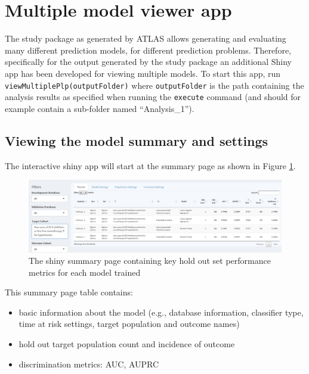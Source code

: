 \documentclass[11pt]{book}
\providecommand{\tightlist}{%
  \setlength{\itemsep}{0pt}\setlength{\parskip}{0pt}}
\theoremstyle{definition}
\theoremstyle{definition}
\theoremstyle{definition}
\theoremstyle{remark}
\begin{document}
\hypertarget{multiple-model-viewer-app}{%
\section{Multiple model viewer app}\label{multiple-model-viewer-app}}

The study package as generated by ATLAS allows generating and evaluating many different prediction models, for different prediction problems. Therefore, specifically for the output generated by the study package an additional Shiny app has been developed for viewing multiple models. To start this app, run \texttt{viewMultiplePlp(outputFolder)} where \texttt{outputFolder} is the path containing the analysis results as specified when running the \texttt{execute} command (and should for example contain a sub-folder named ``Analysis\_1'').

\hypertarget{viewing-the-model-summary-and-settings}{%
\subsection{Viewing the model summary and settings}\label{viewing-the-model-summary-and-settings}}

The interactive shiny app will start at the summary page as shown in Figure \ref{fig:multiShinySummary}.

\begin{figure}

{\centering \includegraphics[width=1\linewidth]{images/PatientLevelPrediction/shiny/shinyFilter} 

}

\caption{The shiny summary page containing key hold out set performance metrics for each model trained}\label{fig:multiShinySummary}
\end{figure}

This summary page table contains:

\begin{itemize}
\tightlist
\item
  basic information about the model (e.g., database information, classifier type, time at risk settings, target population and outcome names)
\item
  hold out target population count and incidence of outcome
\item
  discrimination metrics: AUC, AUPRC
\end{itemize}
\end{document}
